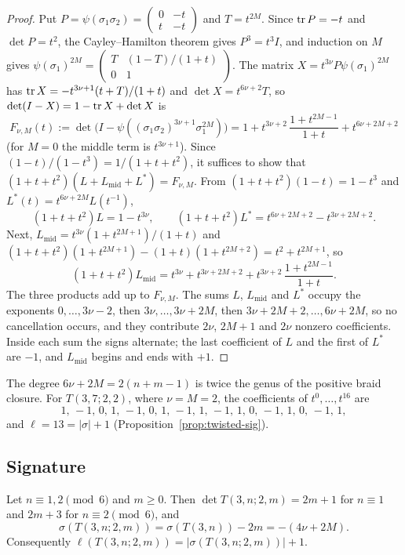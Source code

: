 \begin{proof}
Put $P=\psi(\sigma_1\sigma_2)=\begin{pmatrix}0&-t\\t&-t\end{pmatrix}$ and $T=t^{2M}$. Since $\operatorname{tr} P=-t$ and $\det P=t^2$,
the Cayley--Hamilton theorem gives $P^3=t^3I$, and induction on $M$ gives
$\psi(\sigma_1)^{2M}=\begin{pmatrix}T&(1-T)/(1+t)\\0&1\end{pmatrix}$. The matrix $X=t^{3\nu}P\psi(\sigma_1)^{2M}$ has
$\operatorname{tr} X=-t^{3\nu+1}(t+T)/(1+t)$ and $\det X=t^{6\nu+2}T$, so $\det(I-X)=1-\operatorname{tr} X+\det X$ is
\begin{equation}\label{eq:twisted-F}
F_{\nu,M}(t):=\det\bigl(I-\psi((\sigma_1\sigma_2)^{3\nu+1}\sigma_1^{2M})\bigr)
=1+t^{3\nu+2}\,\frac{1+t^{2M-1}}{1+t}+t^{6\nu+2M+2}
\end{equation}
(for $M=0$ the middle term is $t^{3\nu+1}$). Since $(1-t)/(1-t^3)=1/(1+t+t^2)$, it suffices to show that
$(1+t+t^2)(L+L_{\mathrm{mid}}+L^*)=F_{\nu,M}$. From $(1+t+t^2)(1-t)=1-t^3$ and $L^*(t)=t^{6\nu+2M}L(t^{-1})$,
\[
(1+t+t^2)L=1-t^{3\nu},\qquad(1+t+t^2)L^*=t^{6\nu+2M+2}-t^{3\nu+2M+2}.
\]
Next, $L_{\mathrm{mid}}=t^{3\nu}(1+t^{2M+1})/(1+t)$ and
$(1+t+t^2)(1+t^{2M+1})-(1+t)(1+t^{2M+2})=t^2+t^{2M+1}$, so
\[
(1+t+t^2)L_{\mathrm{mid}}=t^{3\nu}+t^{3\nu+2M+2}+t^{3\nu+2}\,\frac{1+t^{2M-1}}{1+t}.
\]
The three products add up to $F_{\nu,M}$. The sums $L$, $L_{\mathrm{mid}}$ and $L^*$ occupy the exponents
$0,\dots,3\nu-2$, then $3\nu,\dots,3\nu+2M$, then $3\nu+2M+2,\dots,6\nu+2M$, so no cancellation occurs, and they
contribute $2\nu$, $2M+1$ and $2\nu$ nonzero coefficients. Inside each sum the signs alternate; the last
coefficient of $L$ and the first of $L^*$ are $-1$, and $L_{\mathrm{mid}}$ begins and ends with $+1$.
\end{proof}

The degree $6\nu+2M=2(n+m-1)$ is twice the genus of the positive braid closure. For $T(3,7;2,2)$, where
$\nu=M=2$, the coefficients of $t^0,\dots,t^{16}$ are
\[
1,\,-1,\,0,\,1,\,-1,\,0,\,1,\,-1,\,1,\,-1,\,1,\,0,\,-1,\,1,\,0,\,-1,\,1,
\]
and $\ell=13=|\sigma|+1$ (Proposition~\ref{prop:twisted-sig}).

\subsection{Signature}\label{ss:twisted-sig}

\begin{proposition}\label{prop:twisted-sig}
Let $n\equiv1,2\pmod6$ and $m\ge0$. Then $\det T(3,n;2,m)=2m+1$ for $n\equiv1$ and $2m+3$ for
$n\equiv2\pmod 6$, and
\[
\sigma(T(3,n;2,m))=\sigma(T(3,n))-2m=-(4\nu+2M).
\]
Consequently $\ell(T(3,n;2,m))=|\sigma(T(3,n;2,m))|+1$.
\end{proposition}

